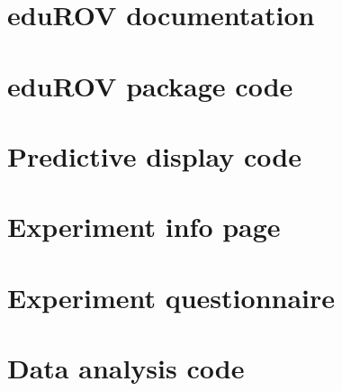 \documentclass[b5paper,10pt,twoside,openright]{book}
\begin{document}
{\begin{appendices}
\chapter*{eduROV documentation}\label{appDoc}







\chapter*{eduROV package code}\label{appCode}


\chapter*{Predictive display code}\label{appPredict}


\chapter*{Experiment info page}\label{appInfo}


\chapter*{Experiment questionnaire}\label{appSurvey}


\chapter*{Data analysis code}\label{appAnalysis}



\end{appendices}}
\end{document}
